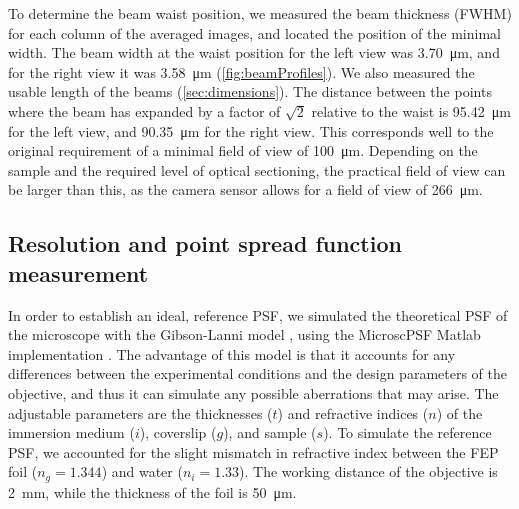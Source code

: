     To determine the beam waist position, we measured the beam thickness (FWHM) for each column of the averaged images, and located the position of the minimal width. The beam width at the waist position for the left view was   \SI{3.70}{\micro m}, and for the right view it was \SI{3.58}{\micro m} (\autoref{fig:beamProfiles}). We also measured the usable length of the beams (\autoref{sec:dimensions}). The distance between the points where the beam has expanded by a factor of $\sqrt2$ relative to the waist is \SI{95.42}{\micro m} for the left view, and \SI{90.35}{\micro m} for the right view. This corresponds well to the original requirement of a minimal field of view of \SI{100}{\micro m}. Depending on the sample and the required level of optical sectioning, the practical field of view can be larger than this, as the camera sensor allows for a field of view of \SI{266}{\micro m}.  

    


  


  \subsection{Resolution and point spread function measurement}

    In order to establish an ideal, reference PSF, we simulated the theoretical PSF of the microscope with the Gibson-Lanni model \cite{gibson_experimental_1992}, using the MicroscPSF Matlab implementation \cite{li_fast_2017}. The advantage of this model is that it accounts for any differences between the experimental conditions and the design parameters of the objective, and thus it can simulate any possible aberrations that may arise. The adjustable parameters are the thicknesses ($t$) and refractive indices ($n$) of the immersion medium ($i$), coverslip ($g$), and sample ($s$). To simulate the reference PSF, we accounted for the slight mismatch in refractive index between the FEP foil ($n_g = 1.344$) and water ($n_i = 1.33$). The working distance of the objective is \SI{2}{mm}, while the thickness of the foil is \SI{50}{\micro m}. 

